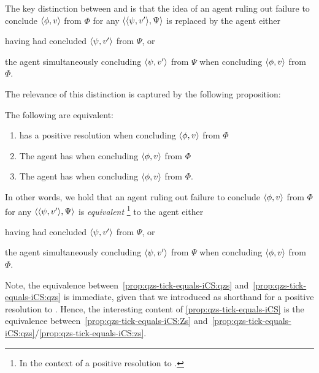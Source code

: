 \begin{note}
  The key distinction between \izs{} and \iZs{} is that the idea of an agent ruling out failure to conclude \(\langle \phi, v \rangle\) from \(\Phi\) for any \requ{} \(\langle \langle \psi, v' \rangle, \Psi \rangle\) is replaced by the agent either
  \begin{enumerate*}[label=(\alph*)]
  \item
    having had concluded \(\langle \psi, v' \rangle\) from \(\Psi\), or
  \item
    the agent simultaneously concluding \(\langle \psi, v' \rangle\) from \(\Psi\) when concluding \(\langle \phi, v \rangle\) from \(\Phi\).
  \end{enumerate*}

  The relevance of this distinction is captured by the following proposition:
    \begin{proposition}
    \label{prop:qzs-tick-equals-iCS}
    The following are equivalent:
    \begin{enumerate}[label=\arabic*., ref=(\arabic*)]
    \item
      \label{prop:qzs-tick-equals-iCS:qzs}
      \qzs{} has a positive resolution when concluding \(\langle \phi, v \rangle\) from \(\Phi\)
    \item
      \label{prop:qzs-tick-equals-iCS:zs}
      The agent has \zs{} when concluding \(\langle \phi, v \rangle\) from \(\Phi\)
    \item
      \label{prop:qzs-tick-equals-iCS:Zs}
      The agent has \Zs{} when concluding \(\langle \phi, v \rangle\) from \(\Phi\).
    \end{enumerate}
    \vspace{-\baselineskip}
  \end{proposition}
  In other words, we hold that an agent ruling out failure to conclude \(\langle \phi, v \rangle\) from \(\Phi\) for any \requ{} \(\langle \langle \psi, v' \rangle, \Psi \rangle\) is \emph{equivalent}%
  \footnote{
    In the context of a positive resolution to \qzs{}.
  }
  to the agent either
  \begin{enumerate*}[label=(\alph*)]
  \item
    having had concluded \(\langle \psi, v' \rangle\) from \(\Psi\), or
  \item
    the agent simultaneously concluding \(\langle \psi, v' \rangle\) from \(\Psi\) when concluding \(\langle \phi, v \rangle\) from \(\Phi\).
  \end{enumerate*}

  Note, the equivalence between~\ref{prop:qzs-tick-equals-iCS:qzs} and~\ref{prop:qzs-tick-equals-iCS:qzs} is immediate, given that we introduced \zs{} as shorthand for a positive resolution to \qzs{}.
  Hence, the interesting content of \autoref{prop:qzs-tick-equals-iCS} is the equivalence between~\ref{prop:qzs-tick-equals-iCS:Zs} and~\ref{prop:qzs-tick-equals-iCS:qzs}/\ref{prop:qzs-tick-equals-iCS:zs}.
\end{note}

